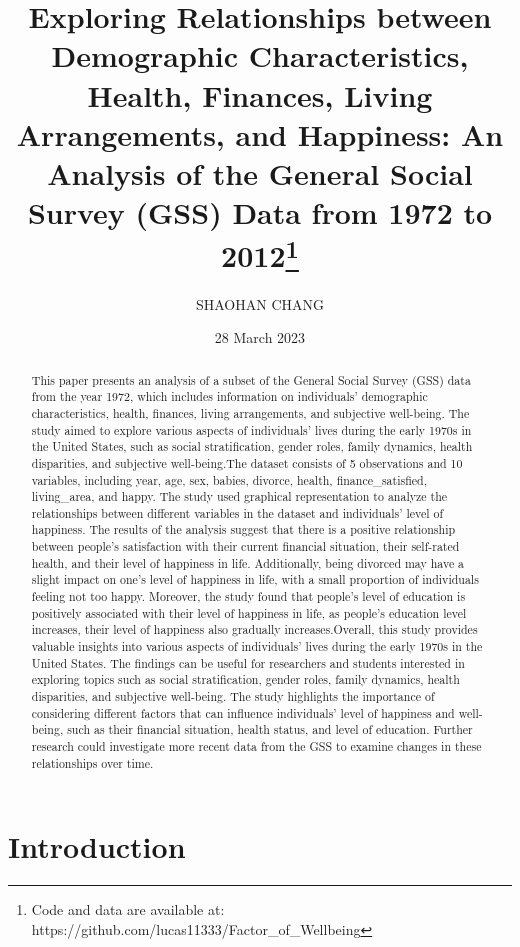 \documentclass[
  letterpaper,
  DIV=11,
  numbers=noendperiod]{scrartcl}
\title{Exploring Relationships between Demographic Characteristics,
Health, Finances, Living Arrangements, and Happiness: An Analysis of the
General Social Survey (GSS) Data from 1972 to 2012\thanks{Code and data
are available at: https://github.com/lucas11333/Factor\_of\_Wellbeing}}
\author{SHAOHAN CHANG}
\date{28 March 2023}
\begin{document}
\maketitle
\begin{abstract}
This paper presents an analysis of a subset of the General Social Survey
(GSS) data from the year 1972, which includes information on
individuals' demographic characteristics, health, finances, living
arrangements, and subjective well-being. The study aimed to explore
various aspects of individuals' lives during the early 1970s in the
United States, such as social stratification, gender roles, family
dynamics, health disparities, and subjective well-being.The dataset
consists of 5 observations and 10 variables, including year, age, sex,
babies, divorce, health, finance\_satisfied, living\_area, and happy.
The study used graphical representation to analyze the relationships
between different variables in the dataset and individuals' level of
happiness. The results of the analysis suggest that there is a positive
relationship between people's satisfaction with their current financial
situation, their self-rated health, and their level of happiness in
life. Additionally, being divorced may have a slight impact on one's
level of happiness in life, with a small proportion of individuals
feeling not too happy. Moreover, the study found that people's level of
education is positively associated with their level of happiness in
life, as people's education level increases, their level of happiness
also gradually increases.Overall, this study provides valuable insights
into various aspects of individuals' lives during the early 1970s in the
United States. The findings can be useful for researchers and students
interested in exploring topics such as social stratification, gender
roles, family dynamics, health disparities, and subjective well-being.
The study highlights the importance of considering different factors
that can influence individuals' level of happiness and well-being, such
as their financial situation, health status, and level of education.
Further research could investigate more recent data from the GSS to
examine changes in these relationships over time.
\end{abstract}
\ifdefined\Shaded\renewenvironment{Shaded}{\begin{tcolorbox}[frame hidden, breakable, borderline west={3pt}{0pt}{shadecolor}, sharp corners, enhanced, interior hidden, boxrule=0pt]}{\end{tcolorbox}}\fi

\hypertarget{introduction}{%
\section{Introduction}\label{introduction}}
\end{document}
